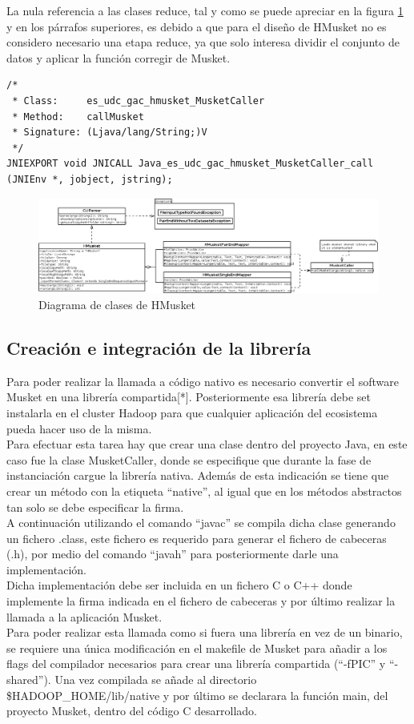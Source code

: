 \documentclass[conference]{IEEEtran}
\begin{document}
La nula referencia a las clases reduce, tal y como se puede apreciar en la figura \ref{class_diagram} y en los párrafos superiores, es debido a que para el diseño de HMusket no es considero necesario una etapa reduce, ya que solo interesa dividir el conjunto de datos y aplicar la función corregir de Musket.

\begin{lstlisting}[style=CStyle, caption=Cabecera JNI generada]
/*
 * Class:     es_udc_gac_hmusket_MusketCaller
 * Method:    callMusket
 * Signature: (Ljava/lang/String;)V
 */
JNIEXPORT void JNICALL Java_es_udc_gac_hmusket_MusketCaller_call (JNIEnv *, jobject, jstring);
\end{lstlisting}

\begin{figure}
	\includegraphics[width=\textwidth]{figures/hmusket.png}
	\caption{Diagrama de clases de HMusket}
	\label{class_diagram}
\end{figure}

\subsection{Creación e integración de la librería}
Para poder realizar la llamada a código nativo es necesario convertir el software Musket en una librería compartida[*]. Posteriormente esa librería debe set instalarla en el cluster Hadoop para que cualquier aplicación del ecosistema pueda hacer uso de la misma.\\
Para efectuar esta tarea hay que crear una clase dentro del proyecto Java, en este caso fue la clase MusketCaller, donde se especifique que durante la fase de instanciación cargue la librería nativa. Además de esta indicación se tiene que crear un método con la etiqueta ``native'', al igual que en los métodos abstractos tan solo se debe especificar la firma.\\
A continuación utilizando el comando ``javac'' se compila dicha clase generando un fichero .class, este fichero es requerido para generar el fichero de cabeceras (.h), por medio del comando ``javah'' para posteriormente darle una implementación.\\
Dicha implementación debe ser incluida en un fichero C o C++ donde implemente la firma indicada en el fichero de cabeceras y por último realizar la llamada a la aplicación Musket.\\
Para poder realizar esta llamada como si fuera una librería en vez de un binario, se requiere una única modificación en el makefile de Musket para añadir a los flags del compilador necesarios para crear una librería compartida (``-fPIC'' y ``-shared''). Una vez compilada se añade al directorio \$HADOOP\_HOME/lib/native y por último se declarara la función main, del proyecto Musket, dentro del código C desarrollado.
\end{document}
